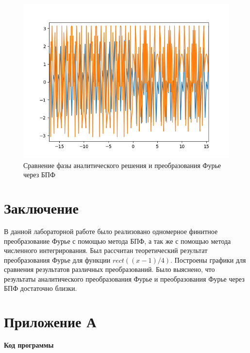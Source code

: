 {\begin{enumerate}
{		\begin{figure}[H]
			\begin{center}
			\includegraphics[scale=0.7]{full_solution_phase}
			\caption{Сравнение фазы аналитического решения и преобразования Фурье через БПФ}
			\label{full_solution}
			\end{center}
		\end{figure}
		}
	\end{enumerate}
}
\newpage

\titleformat{\section}{\large\bfseries\centering}{\thesection}{0.5em}{\MakeUppercase}
\titleformat{\subsection}[block]{\bfseries\hspace{1em}}{\thesubsection}{0.5em}{}

\section*{Заключение}
{
	В данной лабораторной работе было реализовано одномерное финитное преобразование Фурье с помощью метода БПФ, а так же с помощью метода численного интегрирования. Был рассчитан теоретический результат преобразования Фурье для функции $rect((x-1)/4)$. Построены графики для сравнения результатов различных преобразований. Было выяснено, что результаты аналитического преобразования Фурье и преобразования Фурье через БПФ достаточно близки.
}
\newpage


\section*{Приложение А}
{
	\begin{center}
	\textbf{Код программы}
	\end{center}
	
}


